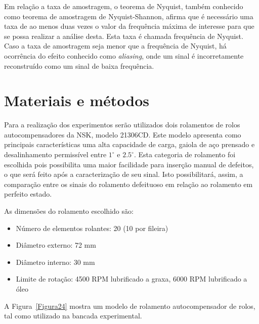 \documentclass[
	12pt,				
	oneside,			
	a4paper,			
	english,			
	brazil,			
	]{abntex2ppgsi}
\begin{document}
Em relação a taxa de amostragem, o teorema de Nyquist, também conhecido como teorema de amostragem de Nyquist-Shannon, afirma que é necessário uma taxa de ao menos duas vezes o valor da frequência máxima de interesse para que se possa realizar a análise desta. Esta taxa é chamada frequência de Nyquist. Caso a taxa de amostragem seja menor que a frequência de Nyquist, há ocorrência do efeito conhecido como \textit{aliasing}, onde um sinal é incorretamente reconstruído como um sinal de baixa frequência.


\chapter{Materiais e métodos}

Para a realização dos experimentos serão utilizados dois rolamentos de rolos autocompensadores da NSK, modelo 21306CD. Este modelo apresenta como principais características uma alta capacidade de carga, gaiola de aço prensado e desalinhamento permissível entre $1^{\circ}$ e $2.5^{\circ}$. Esta categoria de rolamento foi escolhida pois possibilita uma maior facilidade para inserção manual de defeitos, o que será feito após a caracterização de seu sinal. Isto possibilitará, assim, a comparação entre os sinais do rolamento defeituoso em relação ao rolamento em perfeito estado. 

As dimensões do rolamento escolhido são:

\begin{itemize}
	\item Número de elementos rolantes: 20 (10 por fileira)
	\item Diâmetro externo: 72 \si{\mm}
	\item Diâmetro interno: 30 \si{\mm}
	\item Limite de rotação: 4500 RPM lubrificado a graxa, 6000 RPM lubrificado a óleo
\end{itemize}

A Figura~\ref{Figura24} mostra um modelo de rolamento autocompensador de rolos, tal como utilizado na bancada experimental.
\end{document}
